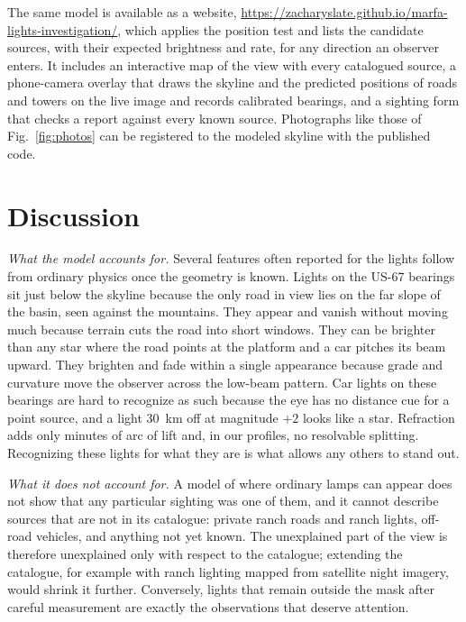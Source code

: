 \documentclass[aip,jap,amsmath,amssymb,reprint,floatfix]{revtex4-2}
\newif\ifanonymous
\newcommand{\website}{\ifanonymous[website withheld for review; a copy is included in the Supporting Information]\else\url{https://zacharyslate.github.io/marfa-lights-investigation/}\fi}
\begin{document}
The same model is available as a website, \website, which applies the position test and lists the candidate sources, with their expected brightness and rate, for any direction an observer enters. It includes an interactive map of the view with every catalogued source, a phone-camera overlay that draws the skyline and the predicted positions of roads and towers on the live image and records calibrated bearings, and a sighting form that checks a report against every known source. Photographs like those of Fig.~\ref{fig:photos} can be registered to the modeled skyline with the published code.

\section{Discussion}\label{sec:discussion}

\textit{What the model accounts for.} Several features often reported for the lights follow from ordinary physics once the geometry is known. Lights on the US-67 bearings sit just below the skyline because the only road in view lies on the far slope of the basin, seen against the mountains. They appear and vanish without moving much because terrain cuts the road into short windows. They can be brighter than any star where the road points at the platform and a car pitches its beam upward. They brighten and fade within a single appearance because grade and curvature move the observer across the low-beam pattern. Car lights on these bearings are hard to recognize as such because the eye has no distance cue for a point source, and a light 30~km off at magnitude $+2$ looks like a star. Refraction adds only minutes of arc of lift and, in our profiles, no resolvable splitting. Recognizing these lights for what they are is what allows any others to stand out.

\textit{What it does not account for.} A model of where ordinary lamps can appear does not show that any particular sighting was one of them, and it cannot describe sources that are not in its catalogue: private ranch roads and ranch lights, off-road vehicles, and anything not yet known. The unexplained part of the view is therefore unexplained only with respect to the catalogue; extending the catalogue, for example with ranch lighting mapped from satellite night imagery, would shrink it further. Conversely, lights that remain outside the mask after careful measurement are exactly the observations that deserve attention.
\end{document}
